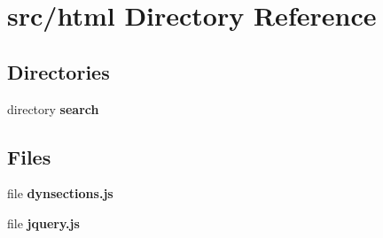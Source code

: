 \section{src/html Directory Reference}
\label{dir_dbc64af3de50f21dd0d1af95d9f4e946}
\subsection*{Directories}
\begin{DoxyCompactItemize}
\item 
directory {\bf search}
\end{DoxyCompactItemize}
\subsection*{Files}
\begin{DoxyCompactItemize}
\item 
file {\bf dynsections.\-js}
\item 
file {\bf jquery.\-js}
\end{DoxyCompactItemize}
